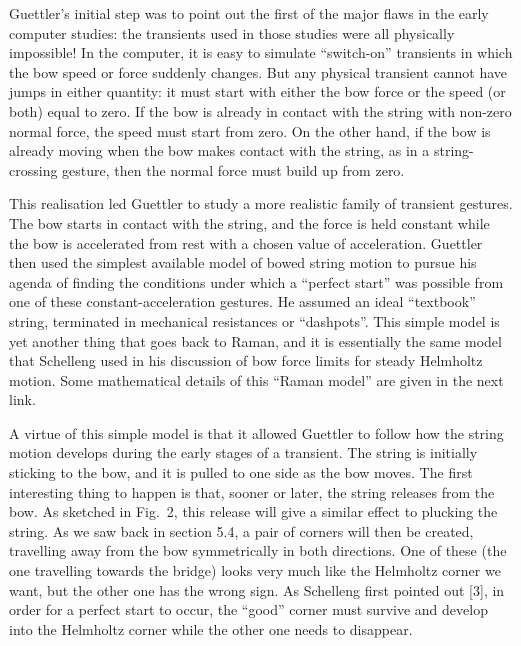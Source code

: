   Guettler's initial step was to point out the first of the major flaws in the 
  early computer studies: the transients used in those studies were all 
  physically impossible! In the computer, it is easy to simulate “switch-on” 
  transients in which the bow speed or force suddenly changes. But any physical 
  transient cannot have jumps in either quantity: it must start with either the 
  bow force or the speed (or both) equal to zero. If the bow is already in 
  contact with the string with non-zero normal force, the speed must start from 
  zero. On the other hand, if the bow is already moving when the bow makes 
  contact with the string, as in a string-crossing gesture, then the normal 
  force must build up from zero. 

  This realisation led Guettler to study a more realistic family of transient 
  gestures. The bow starts in contact with the string, and the force is held 
  constant while the bow is accelerated from rest with a chosen value of 
  acceleration. Guettler then used the simplest available model of bowed string 
  motion to pursue his agenda of finding the conditions under which a “perfect 
  start” was possible from one of these constant-acceleration gestures. He 
  assumed an ideal “textbook” string, terminated in mechanical resistances or 
  “dashpots”. This simple model is yet another thing that goes back to Raman, 
  and it is essentially the same model that Schelleng used in his discussion of 
  bow force limits for steady Helmholtz motion. Some mathematical details of 
  this “Raman model” are given in the next link. 

  A virtue of this simple model is that it allowed Guettler to follow how the 
  string motion develops during the early stages of a transient. The string is 
  initially sticking to the bow, and it is pulled to one side as the bow moves. 
  The first interesting thing to happen is that, sooner or later, the string 
  releases from the bow. As sketched in Fig.\ 2, this release will give a 
  similar effect to plucking the string. As we saw back in section 5.4, a pair 
  of corners will then be created, travelling away from the bow symmetrically 
  in both directions. One of these (the one travelling towards the bridge) 
  looks very much like the Helmholtz corner we want, but the other one has the 
  wrong sign. As Schelleng first pointed out [3], in order for a perfect start 
  to occur, the “good” corner must survive and develop into the Helmholtz 
  corner while the other one needs to disappear. 

